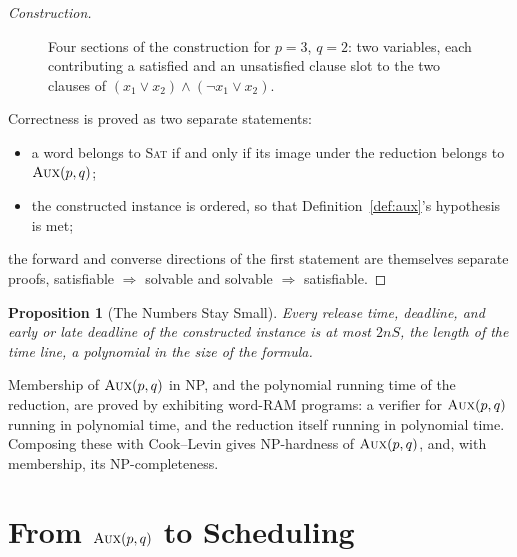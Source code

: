\documentclass[11pt,a4paper]{article}
\newtheorem{proposition}{Proposition}
\theoremstyle{definition}
\newcommand{\AUX}{\textsc{Aux}}
\newcommand{\NP}{\textnormal{\textsf{NP}}}
\newcommand{\SAT}{\textsc{Sat}}
\begin{document}
\begin{proof}[Construction]
\begin{figure}[ht]
\centering
\resizebox{\textwidth}{!}{}
\caption{Four sections of the construction for $p=3$, $q=2$: two
variables, each contributing a satisfied and an unsatisfied clause slot to
the two clauses of $(x_1\lor x_2)\land(\neg x_1\lor x_2)$.}
\label{fig:gadgets}
\end{figure}

Correctness is proved as two separate statements:
\begin{itemize}
\item %
    a word belongs to \SAT{} if and only if its image under the reduction
    belongs to $\AUX(p,q)$;
\item %
    the constructed instance is ordered, so that Definition~\ref{def:aux}'s hypothesis
    is met;
\end{itemize}
the forward and converse directions of the first statement are themselves
separate proofs,
satisfiable $\Rightarrow$ solvable
and
solvable $\Rightarrow$ satisfiable.
\end{proof}

\begin{proposition}[The Numbers Stay Small]
\label{prop:sattimes}
Every release time, deadline, and early or late deadline of the constructed
instance is at most $2nS$, the length of the time line, a polynomial in
the size of the formula.
\end{proposition}

Membership of $\AUX(p,q)$ in \NP, and the polynomial running time of the
reduction, are proved by exhibiting word-RAM programs:
a verifier for $\AUX(p,q)$ running in polynomial time,
and
the reduction itself running in polynomial time.
Composing these with Cook--Levin gives
NP-hardness of $\AUX(p,q)$,
and, with membership,
its NP-completeness.

\section{From $\AUX(p,q)$ to Scheduling}
\end{document}
